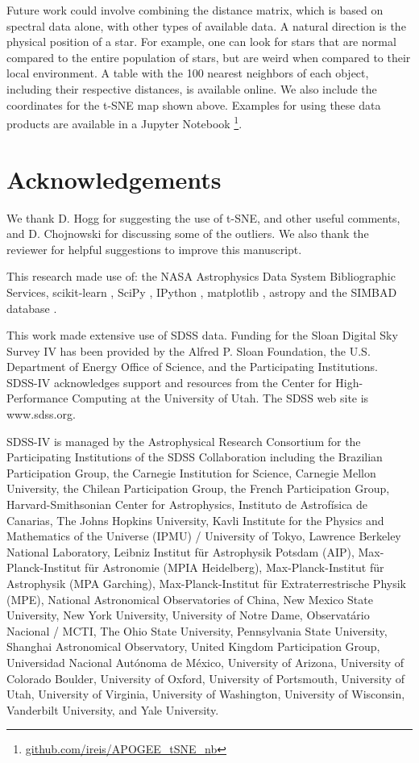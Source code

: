 \documentclass[fleqn,usenatbib]{mnras}
\begin{document}
Future work could involve combining the distance matrix, which is based on spectral data alone, with other types of available data. A natural direction is the physical position of a star. For example, one can look for stars that are normal compared to the entire population of stars, but are weird when compared to their local environment. A table with the 100 nearest neighbors of each object, including their respective distances, is available online. We also include the coordinates for the t-SNE map shown above. Examples for using these data products are available in a Jupyter Notebook \footnote{\href{https://github.com/ireis/APOGEE\_tSNE\_nb}{github.com/ireis/APOGEE\_tSNE\_nb}}.

  

\section*{Acknowledgements}
We thank D. Hogg for suggesting the use of t-SNE, and other useful comments, and D. Chojnowski for discussing some of the outliers. We also thank the reviewer for helpful suggestions to improve this manuscript.

This research made use of: the NASA Astrophysics Data System Bibliographic Services, scikit-learn \citep[][]{pedregosa11}, SciPy \citep[][]{scipy01},  IPython \citep[][]{perez07}, matplotlib \citep[][]{hunter07}, astropy \citep[][]{astropy-collaboration13} and the SIMBAD database \citep[][]{wenger00}.

This work made extensive use of SDSS data. Funding for the Sloan Digital Sky Survey IV has been provided by the Alfred P. Sloan Foundation, the U.S. Department of Energy Office of Science, and the Participating Institutions. SDSS-IV acknowledges
support and resources from the Center for High-Performance Computing at
the University of Utah. The SDSS web site is www.sdss.org.

SDSS-IV is managed by the Astrophysical Research Consortium for the 
Participating Institutions of the SDSS Collaboration including the 
Brazilian Participation Group, the Carnegie Institution for Science, 
Carnegie Mellon University, the Chilean Participation Group, the French Participation Group, Harvard-Smithsonian Center for Astrophysics, 
Instituto de Astrof\'isica de Canarias, The Johns Hopkins University, 
Kavli Institute for the Physics and Mathematics of the Universe (IPMU) / 
University of Tokyo, Lawrence Berkeley National Laboratory, 
Leibniz Institut f\"ur Astrophysik Potsdam (AIP),  
Max-Planck-Institut f\"ur Astronomie (MPIA Heidelberg), 
Max-Planck-Institut f\"ur Astrophysik (MPA Garching), 
Max-Planck-Institut f\"ur Extraterrestrische Physik (MPE), 
National Astronomical Observatories of China, New Mexico State University, 
New York University, University of Notre Dame, 
Observat\'ario Nacional / MCTI, The Ohio State University, 
Pennsylvania State University, Shanghai Astronomical Observatory, 
United Kingdom Participation Group,
Universidad Nacional Aut\'onoma de M\'exico, University of Arizona, 
University of Colorado Boulder, University of Oxford, University of Portsmouth, 
University of Utah, University of Virginia, University of Washington, University of Wisconsin, 
Vanderbilt University, and Yale University.
\end{document}
